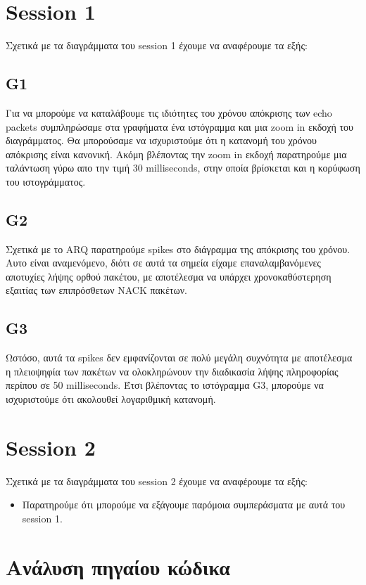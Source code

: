 \documentclass[hidelinks, 12pt, a4paper]{article}
\begin{document}
\section{Session 1}
Σχετικά με τα διαγράμματα του session 1 έχουμε να αναφέρουμε τα εξής:

\subsection{G1}

Για να μπορούμε να καταλάβουμε τις ιδιότητες του χρόνου απόκρισης των echo packets συμπληρώσαμε στα γραφήματα ένα ιστόγραμμα και μια zoom in εκδοχή του διαγράμματος. Θα μπορούσαμε να ισχυριστούμε ότι η κατανομή του χρόνου απόκρισης είναι κανονική. Ακόμη βλέποντας την zoom in εκδοχή παρατηρούμε μια ταλάντωση γύρω απο την τιμή 30 milliseconds, στην οποία βρίσκεται και η κορύφωση του ιστογράμματος.

\subsection{G2}

Σχετικά με το ΑRQ παρατηρούμε spikes στο διάγραμμα της απόκρισης του χρόνου. Αυτο είναι αναμενόμενο, διότι σε αυτά τα σημεία είχαμε επαναλαμβανόμενες αποτυχίες λήψης ορθού πακέτου, με αποτέλεσμα να υπάρχει χρονοκαθύστερηση εξαιτίας των επιπρόσθετων NACK πακέτων.

\subsection{G3}

Ωστόσο, αυτά τα spikes δεν εμφανίζονται σε πολύ μεγάλη συχνότητα με αποτέλεσμα η πλειοψηφία των πακέτων να ολοκληρώνουν την διαδικασία λήψης πληροφορίας περίπου σε 50 milliseconds. Έτσι βλέποντας το ιστόγραμμα G3, μπορούμε να ισχυριστούμε ότι ακολουθεί λογαριθμική κατανομή.

\section{Session 2}

Σχετικά με τα διαγράμματα του session 2 έχουμε να αναφέρουμε τα εξής:
\begin{itemize}
    \item Παρατηρούμε ότι μπορούμε να εξάγουμε παρόμοια συμπεράσματα με αυτά του session 1.
\end{itemize}

\section{Ανάλυση πηγαίου κώδικα}
\end{document}
